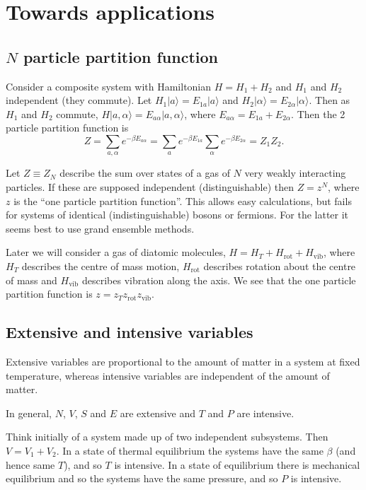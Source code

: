 \documentclass{notes}
\newcommand{\ket}[1]{|#1\rangle}
\begin{document}
\section{Towards applications}

\subsection{$N$ particle partition function}

Consider a composite system with Hamiltonian $H = H_1 + H_2$ and $H_1$
and $H_2$ independent (they commute).  Let $H_1 \ket{a} = E_{1 a}
\ket{a}$ and $H_2 \ket{\alpha} = E_{2 \alpha} \ket{\alpha}$.  Then
as $H_1$ and $H_2$ commute, $H \ket{a,\alpha} = E_{a \alpha}
\ket{a,\alpha}$, where $E_{a \alpha} = E_{1 a} + E_{2 \alpha}$.
Then the 2 particle partition function is
\[
Z = \sum_{a, \alpha} e^{- \beta E_{a \alpha}}
= \sum_a e^{-\beta E_{1 a}} \sum_{\alpha} e^{-\beta E_{2 \alpha}}
= Z_1 Z_2.
\]

Let $Z \equiv Z_N$ describe the sum over states of a gas of $N$ very weakly
interacting particles.  If these are supposed independent (distinguishable)
then $Z = z^N$, where $z$ is the ``one particle partition function''.
This allows easy calculations, but fails for systems of identical
(indistinguishable) bosons or fermions.  For the latter it
seems best to use grand ensemble methods.

Later we will consider a gas of diatomic molecules, $H = H_T + H_{\text{rot}}
+ H_{\text{vib}}$, where $H_T$ describes the centre of mass motion,
$H_{\text{rot}}$ describes rotation about the centre of mass and
$H_{\text{vib}}$ describes vibration along the axis.  We see
that the one particle partition function is
$z = z_T z_{\text{rot}} z_{\text{vib}}$.

\subsection{Extensive and intensive variables}

Extensive variables are proportional to the amount of matter in a system
at fixed temperature, whereas intensive variables are independent of the
amount of matter.

In general, $N$, $V$, $S$ and $E$ are extensive and $T$ and $P$ are intensive.

Think initially of a system made up of two independent subsystems.
Then $V = V_1 + V_2$.  In a state of thermal equilibrium the systems have
the same $\beta$ (and hence same $T$), and so $T$ is intensive.  In
a state of equilibrium there is mechanical equilibrium and so the
systems have the same pressure, and so $P$ is intensive.
\end{document}
